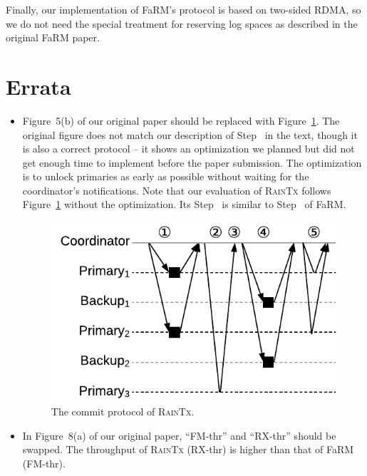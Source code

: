 \documentclass[letterpaper,10pt,twocolumn]{article}
\begin{document}
Finally, our implementation of FaRM's protocol is based on two-sided RDMA, so we do not need the special treatment for reserving log spaces as described in the original FaRM paper.

\section{Errata}
\label{sec:errata}

\begin{itemize}

\item Figure~5(b) of our original paper should be replaced with Figure~\ref{fig:raintx-commit}.
The original figure does not match our description of Step~ in the text, though it is also a correct protocol -- it shows an optimization we planned but did not get enough time to implement before the paper submission.
The optimization is to unlock primaries as early as possible without waiting for the coordinator's notifications.
Note that our evaluation of \textsc{RainTx} follows Figure~\ref{fig:raintx-commit} without the optimization.
Its Step~ is similar to Step~ of FaRM.

\begin{figure}[!ht]
  \centering
  \includegraphics[width=0.7\linewidth]{figures/raintx-commit}
  \caption{The commit protocol of \textsc{RainTx}.}
  \label{fig:raintx-commit}
\end{figure}

\item In Figure~8(a) of our original paper, ``FM-thr'' and ``RX-thr'' should be swapped.
The throughput of \textsc{RainTx} (RX-thr) is higher than that of FaRM (FM-thr).

\end{itemize}



\end{document}
